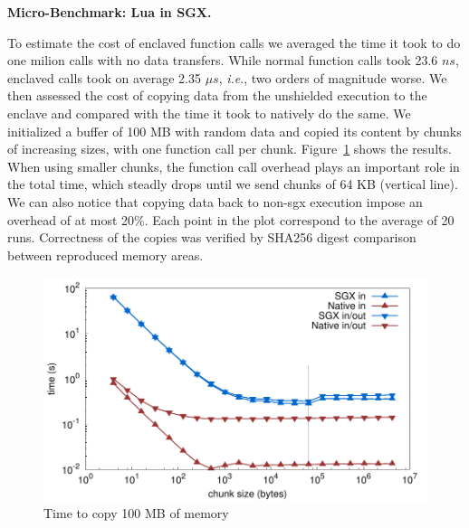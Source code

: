 \textbf{Micro-Benchmark: Lua in SGX.}

To estimate the cost of enclaved function calls we averaged the time it took to do one milion calls with no data transfers.
While normal function calls took 23.6 $ns$, enclaved calls took on average 2.35 $\mu s$, \textit{i.e}., two orders of magnitude worse.
We then assessed the cost of copying data from the unshielded execution to the enclave and compared with the time it took to natively do the same.
We initialized a buffer of 100 MB with random data and copied its content by chunks of increasing sizes, with one function call per chunk.
Figure~\ref{fig:sgxmemcpy} shows the results.
When using smaller chunks, the function call overhead plays an important role in the total time, which steadly drops until we send chunks of 64 KB (vertical line).
We can also notice that copying data back to non-sgx execution impose an overhead of at most 20\%.
Each point in the plot correspond to the average of 20 runs. Correctness of the copies was verified by SHA256 digest comparison between reproduced memory areas.

\begin{figure}[t!]
  \centering
  \includegraphics[scale=0.45]{plots/memcpy/memcpy.pdf}
  \caption{Time to copy 100 MB of memory}
  \label{fig:sgxmemcpy}
\end{figure}


